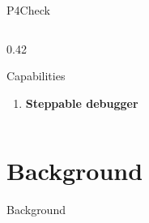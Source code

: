 \documentclass[aspectratio=169]{beamer}
\begin{document}
\begin{frame}{P4Check}
\begin{columns}[T]
\begin{column}{0.42\textwidth}
\begin{block}{Capabilities}
\begin{enumerate}
  \item[\checkmark] \textbf{Steppable debugger}
  \end{enumerate}                                                          
  \end{block}                                                                   
                                                                           
  \end{column}
  \end{columns}
                                                                                
\end{frame}


              

\section{Background}
\begin{frame}
\centering
\LARGE Background
\end{frame}
\end{document}
